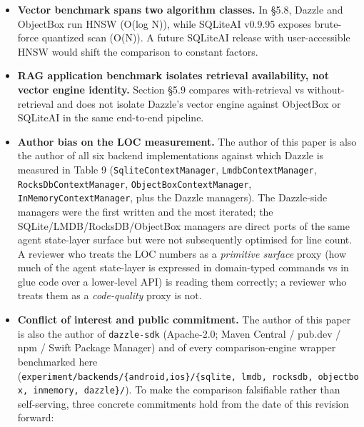 \begin{itemize}
  \textbf{Default-configuration comparison in §5.2.} The storage-latency
  comparison uses default backend configurations. A SQLite setup with manually
  maintained materialized views via triggers would close most of the measured
  retrieval gap. Dazzle's contribution is shipping the pattern natively, not
  claiming algorithmic superiority over SQLite.
\item
  \textbf{Vector benchmark spans two algorithm classes.} In §5.8, Dazzle and
  ObjectBox run HNSW (O(log N)), while SQLiteAI v0.9.95 exposes brute-force
  quantized scan (O(N)). A future SQLiteAI release with user-accessible HNSW
  would shift the comparison to constant factors.
\item
  \textbf{RAG application benchmark isolates retrieval availability, not vector
  engine identity.} Section §5.9 compares with-retrieval vs without-retrieval
  and does not isolate Dazzle's vector engine against ObjectBox or SQLiteAI in
  the same end-to-end pipeline.
\item
  \textbf{Author bias on the LOC measurement.} The author of this paper is also
  the author of all six backend implementations against which Dazzle is measured
  in Table 9 (\texttt{SqliteContextManager}, \texttt{LmdbContextManager},
  \texttt{RocksDbContextManager}, \texttt{ObjectBoxContextManager},
  \texttt{InMemoryContextManager}, plus the Dazzle managers). The Dazzle-side
  managers were the first written and the most iterated; the
  SQLite/LMDB/RocksDB/ObjectBox managers are direct ports of the same agent
  state-layer surface but were not subsequently optimised for line count. A
  reviewer who treats the LOC numbers as a \emph{primitive surface} proxy (how
  much of the agent state-layer is expressed in domain-typed commands vs in glue
  code over a lower-level API) is reading them correctly; a reviewer who treats
  them as a \emph{code-quality} proxy is not.
\item
  \textbf{Conflict of interest and public commitment.} The author of this paper
  is also the author of \texttt{dazzle-sdk} (Apache-2.0; Maven Central / pub.dev
  / npm / Swift Package Manager) and of every comparison-engine wrapper
  benchmarked here
  (\texttt{experiment/backends/\{android,ios\}/\{sqlite,\ lmdb,\ rocksdb,\ objectbox,\ inmemory,\ dazzle\}/}).
  To make the comparison falsifiable rather than self-serving, three concrete
  commitments hold from the date of this revision forward:


\end{itemize}
